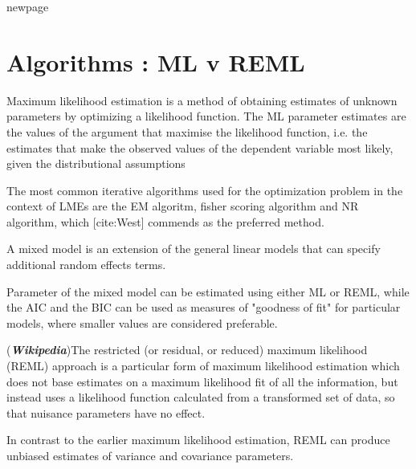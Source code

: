 \documentclass[12pt, a4paper]{report}
\theoremstyle{plain}
\theoremstyle{definition}
\theoremstyle{remark}
\begin{document}
	
	newpage
	
	\section{Algorithms : ML v REML}
	Maximum likelihood estimation is a method of obtaining estimates of unknown parameters by optimizing a likelihood function. The ML
	parameter estimates are the values of the argument that maximise the likelihood function, i.e. the estimates that make the observed
	values of the dependent variable most likely, given the distributional assumptions
	
	The most common iterative algorithms used for the optimization
	problem in the context of LMEs are the EM algoritm, fisher scoring
	algorithm and NR algorithm, which [cite:West] commends as the
	preferred method.
	
	A mixed model is an extension of the general linear models that
	can specify additional random effects terms.
	
	Parameter of the mixed model can be estimated using either ML or
	REML, while the AIC and the BIC can be used as measures of
	"goodness of fit" for particular models, where smaller values are
	considered preferable.
	
	
	(\textbf{\emph{Wikipedia}})The restricted (or residual, or reduced) maximum likelihood (REML) approach is a particular form of maximum likelihood estimation which does not base estimates on a maximum likelihood fit of all the information, but instead uses a likelihood function calculated from a transformed set of data, so that nuisance parameters have no effect.
	
	In contrast to the earlier maximum likelihood estimation, REML can produce unbiased estimates of variance and covariance parameters.
	
\end{document}
